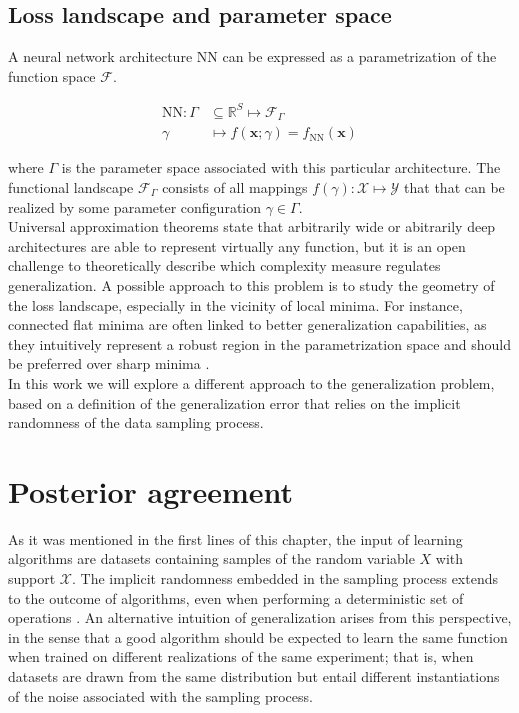 \subsection{Loss landscape and parameter space}


A neural network architecture $\text{NN}$ can be expressed as a parametrization of the function space $\mathcal{F}$.

$$
    \begin{aligned}
        \text{NN}: \Gamma & \subseteq \mathbb{R}^{S} \longmapsto \mathcal{F}_{\Gamma} \\
        \gamma & \longmapsto f(\bm{x}; \gamma) = f_{\text{NN}}(\bm{x})
    \end{aligned}
$$

where $\Gamma$ is the parameter space associated with this particular architecture. The functional
landscape $\mathcal{F}_{\Gamma}$ consists of all mappings $f(\gamma): \mathcal{X} \longmapsto \mathcal{Y}$ that 
that can be realized by some parameter configuration $\gamma \in \Gamma$. \\

Universal approximation theorems state that arbitrarily wide or abitrarily deep architectures
are able to represent virtually any function, but it is an open challenge to theoretically describe which
complexity measure regulates generalization. A possible approach to this problem is to
study the geometry of the loss landscape, especially in the vicinity of local minima. For instance, 
connected flat minima are often linked to better generalization capabilities, as they
intuitively represent a robust region in the parametrization space and should be 
preferred over sharp minima
\cite{jimenezInductiveBiasDeep}. \\

In this work we will explore a different approach to the generalization problem, based on
a definition of the generalization error that relies on the implicit randomness of the
data sampling process. 

\section{Posterior agreement}

As it was mentioned in the first lines of this chapter, the input of learning algorithms are
datasets containing samples of the random variable $X$ with support $\mathcal{X}$. The
implicit randomness embedded in the sampling process extends to the outcome of algorithms,
even when performing a deterministic set of operations
\cite{buhmannDataScienceAlgorithms2022}. 
An alternative intuition of 
generalization arises from this perspective, in the sense that a good algorithm should be
expected to learn the same function when trained on different realizations 
of the same experiment; that is, when datasets are drawn from the same distribution 
but entail different instantiations of the noise associated with the sampling process. \\

